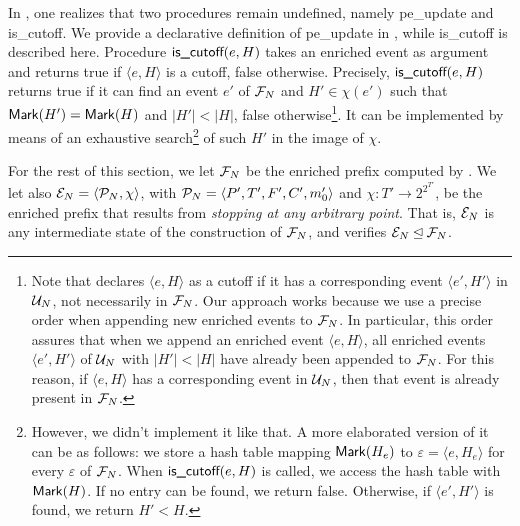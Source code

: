 \documentclass[11pt,a4paper]{article}
\newcommand{\peupdate}{\mbox{\sf pe\_update}}
\newcommand{\iscutoff}{\mbox{\sf is\_cutoff}}
\begin{document}
In , one realizes that two procedures remain
undefined, namely \peupdate{} and \iscutoff{}.  We provide a declarative
definition of \peupdate{} in , while \iscutoff{} is
described here.  Procedure $\iscutoff (e, H)$ takes an enriched event as
argument and returns true if $\langle e, H \rangle$ is a cutoff, false
otherwise.  Precisely, $\iscutoff (e, H)$ returns true if it can find an event
$e'$ of $\mathcal{F}_{N}$ and $H' \in \chi (e')$ such that $\mathsf{Mark }{(H')} = \mathsf{Mark }{(H)}$
and $|H'| < |H|$, false otherwise\footnote{Note that  declares
$\langle e, H \rangle$ as a cutoff if it has a corresponding event $\langle e',
H' \rangle$ in $\mathcal{U}_{N}$, not necessarily in $\mathcal{F}_{N}$.  Our approach works
because we use a precise order when appending new enriched events to $\mathcal{F}_{N}$.
In particular, this order assures that when we append an enriched event
$\langle e, H \rangle$, all enriched events $\langle e', H' \rangle$ of $\mathcal{U}_{N}$ with $|H'| < |H|$ have already been appended to $\mathcal{F}_{N}$.  For this reason,
if $\langle e, H \rangle$ has a corresponding event in $\mathcal{U}_{N}$, then that
event is already present in $\mathcal{F}_{N}$.}.  It can be implemented by means of an
exhaustive search\footnote{However, we didn't implement it like that.  A more
elaborated version of it can be as follows:  we store a hash table mapping
$\mathsf{Mark }{(H_e)}$ to $\varepsilon = \langle e, H_e \rangle$ for every
$\varepsilon$ of $\mathcal{F}_{N}$.  When $\iscutoff (e, H)$ is called, we access the
hash table with $\mathsf{Mark }{(H)}$.  If no entry can be found, we return false.
Otherwise, if $\langle e', H' \rangle$ is found, we return $H' < H$.} of such
$H'$ in the image of $\chi$.  

For the rest of this section, we let $\mathcal{F}_{N}$ be the enriched prefix computed
by .  We let also $\mathcal{E}_{N} = \langle \mathcal{P}_{N}, \chi
\rangle$, with $\mathcal{P}_{N} = \langle P', T', F', C', m'_0 \rangle$ and $\chi : T'
\to 2^{2^{T'}}$, be the enriched prefix that results from \emph{stopping
 at any arbitrary point}.  That is, $\mathcal{E}_{N}$ is any
intermediate state of the construction of $\mathcal{F}_{N}$, and verifies $\mathcal{E}_{N} \unlhd
\mathcal{F}_{N}$.
\end{document}
